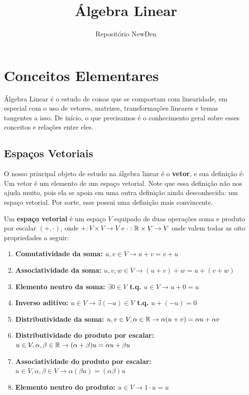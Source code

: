\documentclass[11pt, a4paper]{article}
\title{Álgebra Linear}
\author{Repositório NewDen}
\date{}
\begin{document}
\maketitle
\void[-3]

\lin
\void[-1]
\tableofcontents
\lin
\newpage

\section{Conceitos Elementares}

Álgebra Linear é o estudo de coisas que se comportam com linearidade, em especial com o uso de vetores, matrizes, transformações lineares e temas tangentes a isso. De início, o que precisamos é o conhecimento geral sobre esses conceitos e relações entre eles.

\subsection{Espaços Vetoriais}

O nosso principal objeto de estudo na álgebra linear é o \textbf{vetor}, e sua definição é: Um vetor é um elemento de um espaço vetorial. Note que essa definição não nos ajuda muito, pois ela se apoia em uma outra definição ainda desconhecida: um espaço vetorial. Por sorte, esse possui uma definição mais convincente.

Um \textbf{espaço vetorial} é um espaço \(V\) equipado de duas operações soma e produto por escalar \((+,\cdot)\), onde \(+:V\times V \rightarrow V\) e \(\cdot : \mathbb{R} \times V \rightarrow V\) onde valem todas as oito propriedades a seguir:

\begin{enumerate}
    \item \textbf{Comutatividade da soma: \(u,v\in V \rightarrow u+v=v+u\)}

    \item \textbf{Associatividade da soma: \(u,v,w\in V \rightarrow (u+v)+w=u+(v+w)\)}

    \item \textbf{Elemento neutro da soma: \(\exists 0\in V\) t.q. \(u \in V \rightarrow u+0=u\)}

    \item \textbf{Inverso aditivo: \(u\in V \rightarrow \exists(-u)\in V\) t.q. \(u+(-u)=0\)}

    \item \textbf{Distributividade da soma: \(u,v\in V, \alpha \in \mathbb{R} \rightarrow \alpha(u+v)=\alpha u+\alpha v\)}

    \item \textbf{Distributividade do produto por escalar: \(u\in V,\alpha, \beta \in \mathbb{R} \rightarrow (\alpha + \beta)u=\alpha u + \beta u\)}

    \item \textbf{Associatividade do produto por escalar: \(u\in V,\alpha,\beta\in V \rightarrow \alpha(\beta u)=(\alpha \beta)u\)}

    \item \textbf{Elemento neutro do produto: \(u\in V \rightarrow 1\cdot u=u\)}
\end{enumerate}
\end{document}
